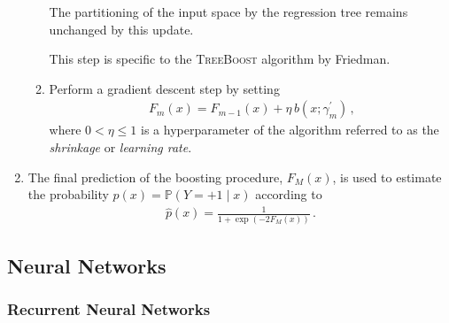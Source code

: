 \begin{enumerate}
\begin{enumerate}
    The partitioning of the input space by the regression tree remains unchanged
    by this update.

    This step is specific to the \textsc{TreeBoost} algorithm by Friedman.

  \item Perform a gradient descent step by setting
    \begin{align*}
      F_m(x) = F_{m - 1}(x) + \eta \, b(x; \gamma_{m}^\prime) \,\text{,}
    \end{align*}
    where $0 < \eta \leq 1$ is a hyperparameter of the algorithm referred to as
    the \emph{shrinkage} or \emph{learning rate}.

  \end{enumerate}

\item The final prediction of the boosting procedure, $F_{M}(x)$, is used to
  estimate the probability $p(x) = \mathbb{P}(Y = +1 \mid x)$ according to
  \begin{align*}
    \hat{p}(x) = \frac{1}{1 + \exp(-2 F_{M}(x))} \,\text{.}
  \end{align*}
\end{enumerate}


\subsection{Neural Networks}

\subsubsection{Recurrent Neural Networks}%
\label{sec:rnn}


